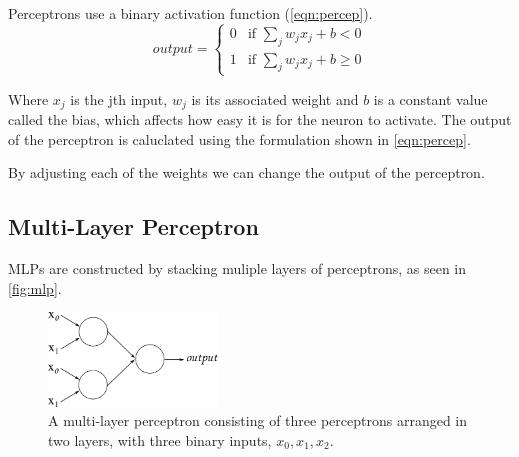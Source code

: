 Perceptrons use a binary activation function (\autoref{eqn:percep}).
\begin{equation} \label{eqn:percep}
output = \begin{cases}
0 &\text{if $\sum_{j} w_j x_j + b < 0$}\\
1 &\text{if $\sum_{j} w_j x_j + b \geq 0$}
\end{cases} 
\end{equation}

Where $x_j$ is the jth input, $w_j$ is its associated weight and $b$ is a constant value called the bias, which affects how easy it is for the neuron to activate. The output of the perceptron is caluclated using the formulation shown in \autoref{eqn:percep}.

By adjusting each of the weights we can change the output of the perceptron. 

%
% 
%
%


\subsection{Multi-Layer Perceptron}
\acp{MLP} are constructed by stacking muliple layers of perceptrons, as seen in \autoref{fig:mlp}. 
\begin{figure}
	\centering
	\includegraphics[width=0.4\textwidth]{Figs/intro2dl/mlp.png}
	
	\caption{A multi-layer perceptron consisting of three perceptrons arranged in two layers, with three binary inputs, $x_0, x_1, x_2$.}
	\label{fig:mlp}
\end{figure}

